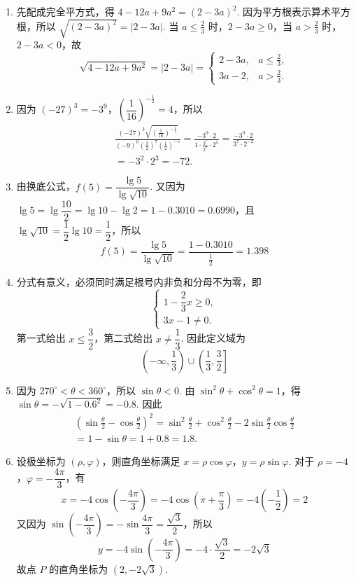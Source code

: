 \begin{solution}
\begin{enumerate}
\item 先配成完全平方式，得 \(4-12a+9a^2=\left(2-3a\right)^2\). 因为平方根表示算术平方根，所以 \(\sqrt{\left(2-3a\right)^2}=\left|2-3a\right|\). 当 \(a\leq\frac{2}{3}\) 时，\(2-3a\geq0\)，当 \(a>\frac{2}{3}\) 时，\(2-3a<0\)，故
\[
\sqrt{4-12a+9a^2}=\left|2-3a\right|=
\begin{cases}
2-3a,&a\leq\frac{2}{3},\\
3a-2,&a>\frac{2}{3}.
\end{cases}
\]

\item 因为 \((-27)^3=-3^9\)，\(\left(\dfrac{1}{16}\right)^{-\frac12}=4\)，所以
\[
\begin{gathered}
\frac{(-27)^3\sqrt{\left(\frac{1}{16}\right)^{-\frac12}}}{(-9)^0\left(\frac32\right)^7\left(\frac12\right)^{-5}}
=\frac{-3^9\cdot2}{1\cdot\frac{3^7}{2^7}\cdot2^5}
=\frac{-3^9\cdot2}{3^7\cdot2^{-2}}\\
=-3^2\cdot2^3=-72.
\end{gathered}
\]

\item 由换底公式，\(f\left(5\right)=\dfrac{\lg5}{\lg\sqrt{10}}\). 又因为 \(\lg5=\lg\dfrac{10}{2}=\lg10-\lg2=1-0.3010=0.6990\)，且 \(\lg\sqrt{10}=\dfrac12\lg10=\dfrac12\)，所以
\[
f\left(5\right)=\frac{\lg5}{\lg\sqrt{10}}=\frac{1-0.3010}{\frac12}=1.398
\]

\item 分式有意义，必须同时满足根号内非负和分母不为零，即
\[
\begin{cases}
1-\dfrac23x\geq0,\\
3x-1\neq0.
\end{cases}
\]
第一式给出 \(x\leq\dfrac32\)，第二式给出 \(x\neq\dfrac13\). 因此定义域为
\[
\left(-\infty,\frac13\right)\cup\left(\frac13,\frac32\right]
\]

\item 因为 \(270^\circ<\theta<360^\circ\)，所以 \(\sin\theta<0\). 由 \(\sin^2\theta+\cos^2\theta=1\)，得 \(\sin\theta=-\sqrt{1-0.6^2}=-0.8\). 因此
\[
\begin{gathered}
\left(\sin\frac\theta2-\cos\frac\theta2\right)^2
=\sin^2\frac\theta2+\cos^2\frac\theta2-2\sin\frac\theta2\cos\frac\theta2\\
=1-\sin\theta=1+0.8=1.8.
\end{gathered}
\]

\item 设极坐标为 \((\rho,\varphi)\)，则直角坐标满足 \(x=\rho\cos\varphi\)，\(y=\rho\sin\varphi\). 对于 \(\rho=-4\)，\(\varphi=-\dfrac{4\pi}{3}\)，有
\[
x=-4\cos\left(-\frac{4\pi}{3}\right)=-4\cos\left(\pi+\frac\pi3\right)=-4\left(-\frac12\right)=2
\]
又因为 \(\sin\left(-\dfrac{4\pi}{3}\right)=-\sin\dfrac{4\pi}{3}=\dfrac{\sqrt3}{2}\)，所以
\[
y=-4\sin\left(-\frac{4\pi}{3}\right)=-4\cdot\frac{\sqrt3}{2}=-2\sqrt3
\]
故点 \(P\) 的直角坐标为 \(\left(2,-2\sqrt3\right)\).
\end{enumerate}
\end{solution}

